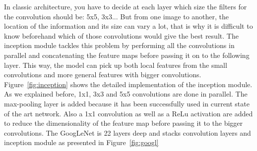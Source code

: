 In classic architecture, you have to decide at each layer which size the filters for the convolution should be: 5x5, 3x3... But from one image to another, the location of the information and its size can vary a lot, that is why it is difficult to know beforehand which of those convolutions would give the best result. The inception module tackles this problem by performing all the convolutions in parallel and concatenating the feature maps before passing it on to the following layer. This way, the model can pick up both local features from the small convolutions and more general features with bigger convolutions. Figure~\ref{fig:inception} shows the detailed implementation of the inception module. As we explained before, 1x1, 3x3 and 5x5 convolutions are done in parallel. The max-pooling layer is added because it has been successfully used in current state of the art network. Also a 1x1 convolution as well as a ReLu activation are added to reduce the dimensionality of the feature map before passing it to the bigger convolutions. The GoogLeNet is 22 layers deep and stacks convolution layers and inception module as presented in Figure~\ref{fig:googl}

